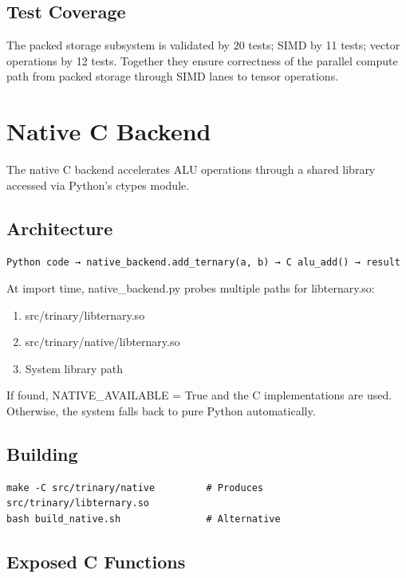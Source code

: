 \documentclass[12pt,a4paper,twoside]{book}
\theoremstyle{trinarytheorem}
\theoremstyle{trinarydefinition}
\newcommand{\code}[1]{\textsf{#1}}
\begin{document}
\section{Test Coverage}

The packed storage subsystem is validated by 20 tests; SIMD by 11 tests; vector
operations by 12 tests. Together they ensure correctness of the parallel compute
path from packed storage through SIMD lanes to tensor operations.

\chapter{Native C Backend}
\label{ch:native}

The native C backend accelerates ALU operations through a shared library accessed via
Python's ctypes module.

\section{Architecture}

\begin{verbatim}
Python code → native_backend.add_ternary(a, b) → C alu_add() → result
\end{verbatim}

At import time, \code{native\_backend.py} probes multiple paths for
\code{libternary.so}:
\begin{enumerate}
    \item \code{src/trinary/libternary.so}
    \item \code{src/trinary/native/libternary.so}
    \item System library path
\end{enumerate}

If found, \code{NATIVE\_AVAILABLE = True} and the C implementations are used.
Otherwise, the system falls back to pure Python automatically.

\section{Building}

\begin{verbatim}
make -C src/trinary/native         # Produces src/trinary/libternary.so
bash build_native.sh               # Alternative
\end{verbatim}

\section{Exposed C Functions}
\end{document}
